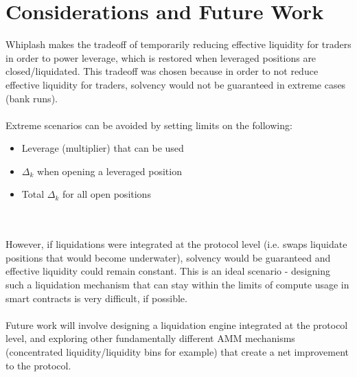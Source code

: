 \documentclass[11pt]{article}
\begin{document}
\section{Considerations and Future Work}

Whiplash makes the tradeoff of temporarily reducing effective liquidity for traders in order to power leverage, which is restored when leveraged positions are closed/liquidated. This tradeoff was chosen because in order to not reduce effective liquidity for traders, solvency would not be guaranteed in extreme cases (bank runs).
\\\\
Extreme scenarios can be avoided by setting limits on the following:
\begin{itemize}
    \item Leverage (multiplier) that can be used
    \item $\Delta_k$ when opening a leveraged position
    \item Total $\Delta_k$ for all open positions
\end{itemize}
\\\\
However, if liquidations were integrated at the protocol level (i.e. swaps liquidate positions that would become underwater), solvency would be guaranteed and effective liquidity could remain constant. This is an ideal scenario - designing such a liquidation mechanism that can stay within the limits of compute usage in smart contracts is very difficult, if possible.
\\\\
Future work will involve designing a liquidation engine integrated at the protocol level, and exploring other fundamentally different AMM mechanisms (concentrated liquidity/liquidity bins for example) that create a net improvement to the protocol.
\end{document}
